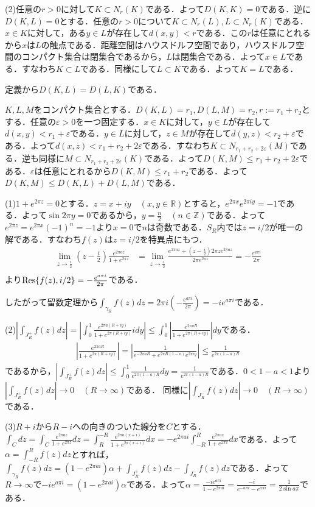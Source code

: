 \documentclass[
		book,
		head_space=20mm,
		foot_space=20mm,
		gutter=10mm,
		line_length=190mm
]{jlreq}
\begin{document}
(2)任意の$r>0$に対して$K\subset N_r(K)$である．よって$D(K,K)=0$である．逆に$D(K,L)=0$とする．任意の$r>0$について$K\subset N_r(L),L\subset N_r(K)$である．$x \in K$に対して，ある$y \in L$が存在して$d(x,y)<r$である．この$r$は任意にとれるから$x$は$L$の触点である．距離空間はハウスドルフ空間であり，ハウスドルフ空間のコンパクト集合は閉集合であるから，$L$は閉集合である．よって$x \in L$である．すなわち$K\subset L$である．同様にして$L\subset K$である．よって$K=L$である．

定義から$D(K,L)=D(L,K)$である．

$K,L,M$をコンパクト集合とする．$D(K,L)=r_1,D(L,M)=r_2,r:=r_1+r_2$とする．任意の$\varepsilon>0$を一つ固定する．$x \in K$に対して，$y \in L$が存在して$d(x,y)<r_1+\varepsilon$である．$y \in L$に対して，$z \in M$が存在して$d(y,z)<r_2+\varepsilon$である．よって$d(x,z)<r_1+r_2+2\varepsilon$である．すなわち$K\subset N_{r_1+r_2+2\varepsilon}(M)$である．逆も同様に$M \subset N_{r_1+r_2+2\varepsilon}(K)$である．よって$D(K,M)\le r_1+r_2+2\varepsilon$である．$\varepsilon$は任意にとれるから$D(K,M)\le r_1+r_2$である．よって$D(K,M)\le D(K,L)+D(L,M)$である．

(1)$1+e^{2\pi z}=0$とする．$z=x+iy \quad(x,y\in \mathbb{R})$とすると，$e^{2\pi x}e^{2\pi iy}=-1$である．よって$\sin 2\pi y=0$であるから，$y=\frac{n}{2}\quad (n \in \mathbb{Z})$である．よって$e^{2\pi z}=e^{2\pi x}(-1)^n=-1$より$x=0$で$n$は奇数である．$S_R$内では$z=i/2$が唯一の解である．すなわち$f(z)$は$z=i/2$を特異点にもつ．
\begin{align}
	\lim_{z\to \frac{i}{2}}(z-\frac{i}{2})\frac{e^{2\pi a z}}{1+e^{2\pi z}}&=\lim_{z\to \frac{i}{2}}\frac{e^{2\pi a z}+(z-\frac{i}{2})2\pi ze^{2\pi az}}{2\pi e^{2\pi z}}=-\frac{e^{a \pi i}}{2\pi}\\
\end{align}
より$\Res{f(z),i/2}=-\frac{e^{a \pi i}}{2\pi}$である．

したがって留数定理から$\int_{\gamma_R}f(z)dz=2\pi i(-\frac{e^{a \pi i}}{2\pi})=-i e^{a \pi i}$である．

(2)$|\int_{J_R^+}f(z)dz|=|\int_0^{1} \frac{e^{2\pi a (R+iy)}}{1+e^{2\pi (R+iy)}}idy|\le \int_0^{1}|\frac{e^{2\pi a R}}{1+e^{2\pi (R+iy)}}|dy$である．
\begin{align}
	\left|\frac{e^{2\pi a R}}{1+e^{2\pi (R+iy)}}\right|= \left| \frac{1}{e^{-2\pi aR}+e^{2\pi R(1-a)}e^{2\pi iy}}\right|\le \frac{1}{e^{2\pi(1-a)R}}
\end{align}であるから，$|\int_{J_R^+}f(z)dz|\le \int_0^{1}\frac{1}{e^{2\pi(1-a)R}}dy =\frac{1}{e^{2\pi(1-a)R}}$である．$0<1-a<1$より$|\int_{J_R^+}f(z)dz|\to 0\quad (R\to \infty)$である．
同様に$|\int_{J_R^-}f(z)dz|\to 0\quad (R\to \infty)$である．

(3)$R+i$から$R-i$への向きのついた線分を$C$とする．
$\int_C dz=\int_C\frac{e^{2\pi a z}}{1+e^{2\pi z}}dz=\int_R^{-R}\frac{e^{2\pi a (x+i)}}{1+e^{2\pi (x+i)}}dx=-e^{2\pi a i}\int_{-R}^R \frac{e^{2\pi a x}}{1+e^{2\pi x}}dx$である．よって$\alpha=\int_{-R}^Rf(z)dz$とすれば，
$\int_{\gamma_R}f(z)dz=(1-e^{2\pi a i})\alpha+\int_{J^+_R}f(z)dz-\int_{J^-_R}f(z)dz$である．よって$R\rightarrow \infty$で$-i e^{a \pi i}=(1-e^{2\pi a i})\alpha$である．よって$\alpha=\frac{-i e^{a \pi i}}{1-e^{2\pi a i}}=\frac{-i}{e^{-a\pi i}-e^{a \pi i}}=\frac{1}{2\sin a\pi}$である．
\end{document}
